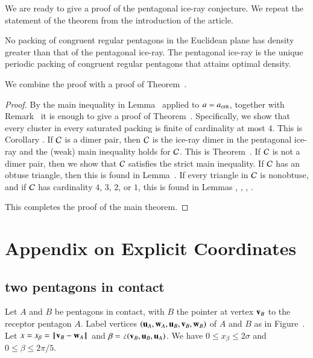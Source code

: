 We are ready to give a proof of the pentagonal ice-ray conjecture. We
repeat the statement of the theorem from the introduction of the
article.

\begin{theorem}   
  No packing of congruent regular pentagons in the Euclidean plane has
  density greater than that of the pentagonal ice-ray.  The pentagonal
  ice-ray is the unique periodic packing of congruent regular
  pentagons that attains optimal density.
\end{theorem}

We combine the proof with a proof of Theorem~.

\begin{proof}
  By the main inequality in Lemma~ applied to
  $a=a_\text{crit}$, together with Remark~ it is enough to
  give a proof of Theorem~.  Specifically, we show that
  every cluster in every saturated packing is finite of cardinality at
  most $4$.  This is Corollary .  If $\mathcal C$ is a dimer
  pair, then $\mathcal C$ is the ice-ray dimer in the pentagonal ice-ray and
  the (weak) main inequality holds for $\mathcal C$.  This is
  Theorem~.  If $\mathcal C$ is not a dimer pair, then we show
  that $\mathcal C$ satisfies the strict main inequality.  If $\mathcal C$ has an
  obtuse triangle, then this is found in Lemma~.  If
  every triangle in $\mathcal C$ is nonobtuse, and if $\mathcal C$ has cardinality
  $4$, $3$, $2$, or $1$, this is found in Lemmas ,
  , , .

  This completes the proof of the main theorem.
\end{proof}



\section{Appendix on Explicit Coordinates}


\subsection{two pentagons in contact}

Let $A$ and $B$ be pentagons in contact, with $B$ the pointer at
vertex ${\mathbf v}_B$ to the receptor pentagon $A$.  Label vertices
$({\mathbf u}_A,{\mathbf w}_A,{\mathbf u}_B,{\mathbf v}_B,{\mathbf w}_B)$ of $A$ and $B$ as in
Figure~.  Let $x=x_\beta=\norm{\v_B}{\w_A}$ and $\beta
= \angle({\mathbf v}_B,{\mathbf u}_B,{\mathbf u}_A)$.  We have $0\le x_\beta\le 2\sigma$ and
$0\le \beta\le 2\pi/5$.

